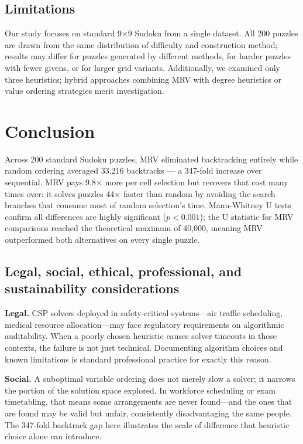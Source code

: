 \documentclass[conference]{IEEEtran}
\begin{document}
\subsection{Limitations}

Our study focuses on standard 9×9 Sudoku from a single dataset. All 200 puzzles are drawn from the same distribution of difficulty and construction method; results may differ for puzzles generated by different methods, for harder puzzles with fewer givens, or for larger grid variants. Additionally, we examined only three heuristics; hybrid approaches combining MRV with degree heuristics or value ordering strategies merit investigation.

\section{Conclusion}

Across 200 standard Sudoku puzzles, MRV eliminated backtracking entirely while random ordering averaged 33,216 backtracks — a 347-fold increase over sequential. MRV pays 9.8$\times$ more per cell selection but recovers that cost many times over: it solves puzzles 44$\times$ faster than random by avoiding the search branches that consume most of random selection's time. Mann-Whitney U tests confirm all differences are highly significant ($p < 0.001$); the U statistic for MRV comparisons reached the theoretical maximum of 40,000, meaning MRV outperformed both alternatives on every single puzzle.

\subsection{Legal, social, ethical, professional, and sustainability considerations}

\textbf{Legal.} CSP solvers deployed in safety-critical systems---air traffic scheduling, medical resource allocation---may face regulatory requirements on algorithmic auditability. When a poorly chosen heuristic causes solver timeouts in those contexts, the failure is not just technical. Documenting algorithm choices and known limitations is standard professional practice for exactly this reason.

\textbf{Social.} A suboptimal variable ordering does not merely slow a solver; it narrows the portion of the solution space explored. In workforce scheduling or exam timetabling, that means some arrangements are never found---and the ones that are found may be valid but unfair, consistently disadvantaging the same people. The 347-fold backtrack gap here illustrates the scale of difference that heuristic choice alone can introduce.
\end{document}
